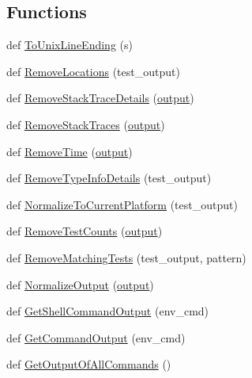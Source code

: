 \subsection*{Functions}
\begin{DoxyCompactItemize}
\item 
def \mbox{\hyperlink{namespacegoogletest_1_1test_1_1googletest-output-test_a3ff2f267c44ed5dd27ba7c518c2e5eef}{To\+Unix\+Line\+Ending}} (s)
\item 
def \mbox{\hyperlink{namespacegoogletest_1_1test_1_1googletest-output-test_a8887aec81bfc96f81fa1d252b5a6d01d}{Remove\+Locations}} (test\+\_\+output)
\item 
def \mbox{\hyperlink{namespacegoogletest_1_1test_1_1googletest-output-test_aa1969514763d6a962445f53ecfb41abf}{Remove\+Stack\+Trace\+Details}} (\mbox{\hyperlink{namespacegoogletest_1_1test_1_1googletest-output-test_a6773c2217ae4694b4db5610620562437}{output}})
\item 
def \mbox{\hyperlink{namespacegoogletest_1_1test_1_1googletest-output-test_a9a0decf62a91fdd58802a2da17829bb1}{Remove\+Stack\+Traces}} (\mbox{\hyperlink{namespacegoogletest_1_1test_1_1googletest-output-test_a6773c2217ae4694b4db5610620562437}{output}})
\item 
def \mbox{\hyperlink{namespacegoogletest_1_1test_1_1googletest-output-test_ac674d774c3fa9db5e31a2faba63a4cf9}{Remove\+Time}} (\mbox{\hyperlink{namespacegoogletest_1_1test_1_1googletest-output-test_a6773c2217ae4694b4db5610620562437}{output}})
\item 
def \mbox{\hyperlink{namespacegoogletest_1_1test_1_1googletest-output-test_aa20c45603c87652d78a77427bd88276f}{Remove\+Type\+Info\+Details}} (test\+\_\+output)
\item 
def \mbox{\hyperlink{namespacegoogletest_1_1test_1_1googletest-output-test_a5fc239cf98d093a53237164567c37e3e}{Normalize\+To\+Current\+Platform}} (test\+\_\+output)
\item 
def \mbox{\hyperlink{namespacegoogletest_1_1test_1_1googletest-output-test_a80bd550648220abb73a9fe43cadab20b}{Remove\+Test\+Counts}} (\mbox{\hyperlink{namespacegoogletest_1_1test_1_1googletest-output-test_a6773c2217ae4694b4db5610620562437}{output}})
\item 
def \mbox{\hyperlink{namespacegoogletest_1_1test_1_1googletest-output-test_ae12b8b8e5cc6efd5dd1452923b347cb7}{Remove\+Matching\+Tests}} (test\+\_\+output, pattern)
\item 
def \mbox{\hyperlink{namespacegoogletest_1_1test_1_1googletest-output-test_a9654817b6fb7fc3acc034ea375b635c8}{Normalize\+Output}} (\mbox{\hyperlink{namespacegoogletest_1_1test_1_1googletest-output-test_a6773c2217ae4694b4db5610620562437}{output}})
\item 
def \mbox{\hyperlink{namespacegoogletest_1_1test_1_1googletest-output-test_aa5a7ea5b9a73e1538841493ed39fcca6}{Get\+Shell\+Command\+Output}} (env\+\_\+cmd)
\item 
def \mbox{\hyperlink{namespacegoogletest_1_1test_1_1googletest-output-test_a57e27de68d1c4a6ae2fea7321123060b}{Get\+Command\+Output}} (env\+\_\+cmd)
\item 
def \mbox{\hyperlink{namespacegoogletest_1_1test_1_1googletest-output-test_a7baabb9ec5690eff9a0985fb468c21da}{Get\+Output\+Of\+All\+Commands}} ()
\end{DoxyCompactItemize}
